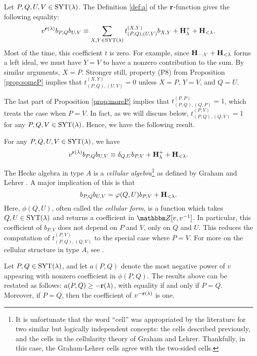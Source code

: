 Let $P,Q,U,V \in \operatorname{SYT}(\lambda)$. The Definition \ref{def:a} of the $\mathbf{r}$-function gives the following equality:
\[ v^{\mathbf{r}(\lambda)} b_{P,Q} b_{U,V} \equiv \sum_{X,Y \in \operatorname{SYT}(\lambda)} t_{(P,Q),(U,V)}^{(X,Y)} b_{X,Y} + {\mathbf H}^+_\lambda + {\mathbf H}_{< \lambda}.\]
Most of the time, this coefficient $t$ is zero. For example, since ${\mathbf H}_{-,V} + {\mathbf H}_{< \lambda}$ forms a left ideal, we must have $Y = V$ to have a nonzero contribution to the sum. By similar arguments, $X = P$. Stronger still, property (P8) from Proposition \ref{prop:someP} implies that $t_{(P,Q),(U,V)}^{(X,Y)} = 0$ unless $X=P$, $Y=V$, and $Q=U$.

The last part of Proposition \ref{prop:moreP} implies that $t_{(P,Q),(Q,P)}^{(P,P)} = 1$, which treats the case when $P = V$. In fact, as we will discuss below,
$t_{(P,Q),(Q,V)}^{(P,V)}=1$ for any $P,Q,V \in \operatorname{SYT}(\lambda)$. Hence, we have the following result.

\begin{lemma} \label{lem:howPQmult} For any $P, Q, U, V \in \operatorname{SYT}(\lambda)$, we have
\begin{equation} \label{eq:howPQmult} v^{\mathbf{r}(\lambda)} b_{P,Q} b_{U,V} \equiv \delta_{Q,U} b_{P,V} + {\mathbf H}^+_\lambda + {\mathbf H}_{< \lambda}.\end{equation} \end{lemma}

The Hecke algebra in type $A$ is a \emph{cellular algebra}\footnote{It is unfortunate that the word ``cell'' was appropriated by the literature for two similar but logically independent concepts: the cells described previously, and the cells in the cellularity theory of Graham and Lehrer. Thankfully, in this case, the Graham-Lehrer cells agree with the two-sided cells.} as defined by Graham and Lehrer \cite{GraLeh}. A major implication of this is that
\begin{equation} \label{eq:howPQmultcloser} b_{P,Q} b_{U,V} = \varphi(Q,U) b_{P,V} + {\mathbf H}_{< \lambda}. \end{equation}
Here, $\phi(Q,U)$, often called the \emph{cellular form}, is a function which takes $Q, U \in \operatorname{SYT}(\lambda)$ and returns a coefficient in $\Z[v,v\inv]$. In particular, this coefficient of $b_{P,V}$ does not depend on $P$ and $V$, only on $Q$ and $U$. This reduces the computation of $t_{(P,Q),(Q,V)}^{(P,V)}$ to the special case where $P = V$. For more on the cellular structure in type $A$, see \cite{GeordiePQ}.

Let $P,Q \in \operatorname{SYT}(\lambda)$, and let $a(P,Q)$ denote the most negative power of $v$ appearing with nonzero coefficient in $\phi(P,Q)$. The results above can be restated as follows: $a(P,Q)
\ge -\mathbf{r}(\lambda)$, with equality if and only if $P = Q$. Moreover, if $P=Q$, then the coefficient of $v^{-\mathbf{r}(\lambda)}$ is one.

